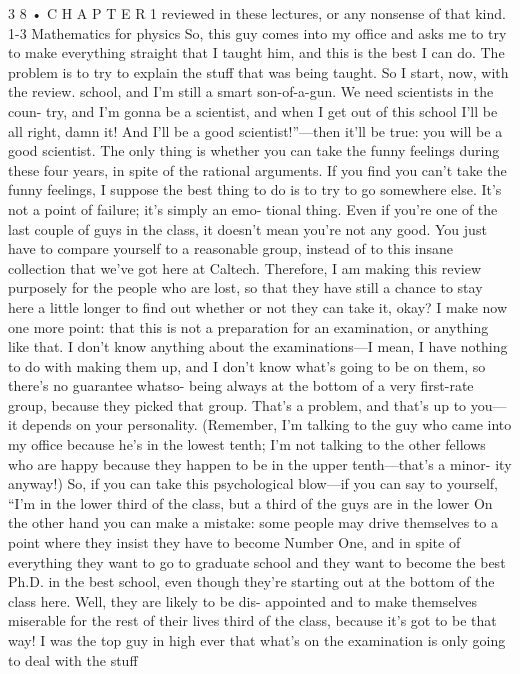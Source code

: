 \documentclass[10pt,oneside]{article}
\begin{document}
3 8 • C H A P T E R  1 reviewed in these lectures, or any nonsense of that kind. 1-3 Mathematics for physics So, this guy comes into my office and asks me to try to make everything straight that I taught him, and this is the best I can do. The problem is to try to explain the stuff that was being taught. So I start, now, with the review. school, and I’m still a smart son-of-a-gun. We need scientists in the coun- try, and I’m gonna be a scientist, and when I get out of this school I’ll be all right, damn it! And I’ll be a good scientist!”---then it’ll be true: you will be a good scientist. The only thing is whether you can take the funny feelings during these four years, in spite of the rational arguments. If you find you can’t take the funny feelings, I suppose the best thing to do is to try to go somewhere else. It’s not a point of failure; it’s simply an emo- tional thing. Even if you’re one of the last couple of guys in the class, it doesn’t mean you’re not any good. You just have to compare yourself to a reasonable group, instead of to this insane collection that we’ve got here at Caltech. Therefore, I am making this review purposely for the people who are lost, so that they have still a chance to stay here a little longer to find out whether or not they can take it, okay? I make now one more point: that this is not a preparation for an examination, or anything like that. I don’t know anything about the examinations---I mean, I have nothing to do with making them up, and I don’t know what’s going to be on them, so there’s no guarantee whatso- being always at the bottom of a very first-rate group, because they picked that group. That’s a problem, and that’s up to you---it depends on your personality. (Remember, I’m talking to the guy who came into my office because he’s in the lowest tenth; I’m not talking to the other fellows who are happy because they happen to be in the upper tenth---that’s a minor- ity anyway!) So, if you can take this psychological blow---if you can say to yourself, “I’m in the lower third of the class, but a third of the guys are in the lower On the other hand you can make a mistake: some people may drive themselves to a point where they insist they have to become Number One, and in spite of everything they want to go to graduate school and they want to become the best Ph.D. in the best school, even though they’re starting out at the bottom of the class here. Well, they are likely to be dis- appointed and to make themselves miserable for the rest of their lives third of the class, because it’s got to be that way! I was the top guy in high ever that what’s on the examination is only going to deal with the stuff\par
\end{document}
